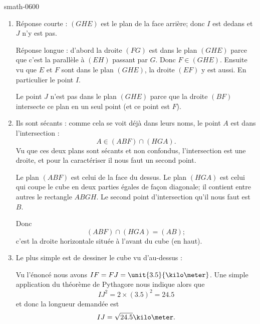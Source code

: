
\begin{corrige}{smath-0600}

    \begin{enumerate}
        \item
            Réponse courte : \( (GHE)\) est le plan de la face arrière; donc \( I\) est dedans et \( J\) n'y est pas.

            Réponse longue : d'abord la droite \( (FG)\) est dans le plan \( (GHE)\) parce que c'est la parallèle à \( (EH)\) passant par \( G\). Donc \( F\in (GHE)\). Ensuite vu que \( E\) et \( F\) sont dans le plan \( (GHE)\), la droite \( (EF)\) y est aussi. En particulier le point \( I\).

            Le point \( J\) n'est pas dans le plan \( (GHE)\) parce que la droite \( (BF)\) intersecte ce plan en un seul point (et ce point est \( F\)).

        \item
            Ils sont sécants : comme cela se voit déjà dans leurs noms, le point \( A\) est dans l'intersection :
            \begin{equation}
                A\in (ABF)\cap(HGA).
            \end{equation}
            Vu que ces deux plans sont sécants et non confondus, l'intersection est une droite, et pour la caractériser il nous faut un second point.

            Le plan \( (ABF)\) est celui de la face du dessus. Le plan \( (HGA)\) est celui qui coupe le cube en deux parties égales de façon diagonale; il contient entre autres le rectangle \( ABGH\). Le second point d'intersection qu'il nous faut est \( B\).

            Donc
            \begin{equation}
                (ABF)\cap(HGA)=(AB);
            \end{equation}
            c'est la droite horizontale située à l'avant du cube (en haut).

        \item
            Le plus simple est de dessiner le cube vu d'au-dessus :
            \begin{center}
                
            \end{center}
            Vu l'énoncé nous avons \( IF=FJ=\unit{3.5}{\kilo\meter}\). Une simple application du théorème de Pythagore nous indique alors que
            \begin{equation}
                IJ^2=2\times (3.5)^2=24.5
            \end{equation}
            et donc la longueur demandée est
            \begin{equation}
                IJ=\sqrt{24.5}\kilo\meter.
            \end{equation}
            
    \end{enumerate}

\end{corrige}

